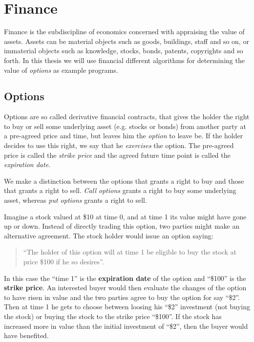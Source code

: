\chapter{Finance}

Finance is the subdiscipline of economics concerned with appraising
the value of assets. Assets can be material objects such as goods,
buildings, staff and so on, or immaterial objects such as knowledge,
stocks, bonds, patents, copyrights and so forth. In this thesis we
will use financial different algorithms for determining the value of
\textit{options} as example programs.


\section{Options}
Options are so called derivative financial contracts, that gives the
holder the right to buy or sell some underlying asset (e.g. stocks or
bonds) from another party at a pre-agreed price and time, but leaves
him the \textit{option} to leave be. If the holder decides to use this
right, we say that he \textit{exercises} the option. The pre-agreed
price is called the \textit{strike price} and the agreed future time
point is called the \textit{expiration date}.

We make a distinction between the options that grants a right to buy
and those that grants a right to sell. \textit{Call options} grants a
right to buy some underlying asset, whereas \textit{put options}
grants a right to sell.

\begin{example}
  Imagine a stock valued at \$10 at time 0, and at time 1 its value
  might have gone up or down. Instead of directly trading this option,
  two parties might make an alternative agreement. The stock holder
  would issue an option saying:
  \begin{quotation}
    ``The holder of this option will at time 1 be eligible to buy the
    stock at price \$100 if he so desires''.
  \end{quotation}
  In this case the ``time 1'' is the \textbf{expiration date} of the
  option and ``\$100'' is the \textbf{strike price}. An interested
  buyer would then evaluate the changes of the option to have risen in
  value and the two parties agree to buy the option for say
  ``\$2''. Then at time 1 he gets to choose between loosing his ``\$2''
  investment (not buying the stock) or buying the stock to the strike
  price ``\$100''. If the stock has increased more in value than the
  initial investment of ``\$2'', then the buyer would have benefited.
\end{example}

